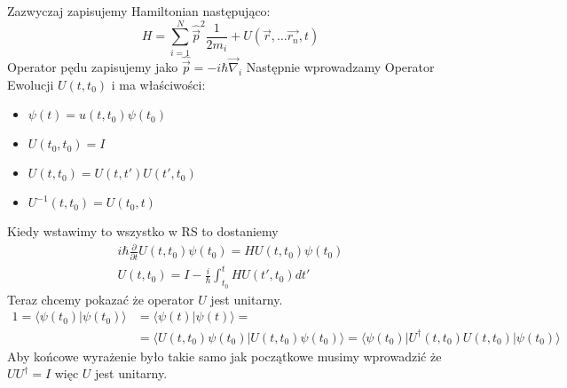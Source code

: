 Zazwyczaj zapisujemy Hamiltonian następująco:
$$  H=\sum_{i=1}^{N} \hat{\overrightarrow{p}}^{2} \frac{1}{2 m_{i}} + U\left(\vec{r}, \ldots \vec{r_{n}}, t\right)  $$
Operator pędu zapisujemy jako $\hat{\vec{p}} = -i \hbar \vec{\nabla}_i$
Następnie wprowadzamy Operator Ewolucji $U(t, t_0)$ i ma właściwości:
\begin{itemize}
	\item $\psi(t)=u\left(t, t_{0}\right) \psi\left(t_{0}\right)$
	\item $U(t_0, t_0) = I$
	\item $U(t, t_0) = U(t, t')U(t', t_0)$
	\item $U^{-1}(t, t_0) = U(t_0, t)$
\end{itemize}
Kiedy wstawimy to wszystko w RS to dostaniemy 
\begin{equation*}
	\begin{split}
		i \hbar \frac{\partial}{\partial t} U(t, t_0) \psi(t_0) = H U(t, t_0) \psi(t_0) \\
		U(t, t_0) = I - \frac{i}{\hbar} \int_{t_0}^t HU(t', t_0)dt'	
	\end{split}
\end{equation*}
Teraz chcemy pokazać że operator $U$ jest unitarny.
\begin{equation*}
	\begin{split}
		1=\langle\psi(t_{0}) | \psi(t_0)\rangle &= \langle\psi(t) | \psi(t)\rangle = \\
		&=\langle U(t, t_0) \psi(t_0) | U(t, t_0) \psi(t_0) \rangle = \langle \psi(t_0) | U^{\dagger}(t, t_0) U(t, t_0)| \psi(t_0)  \rangle
	\end{split}
\end{equation*}
Aby końcowe wyrażenie było takie samo jak początkowe musimy wprowadzić że $U U^{\dagger} = I$ więc $U$ jest unitarny.


